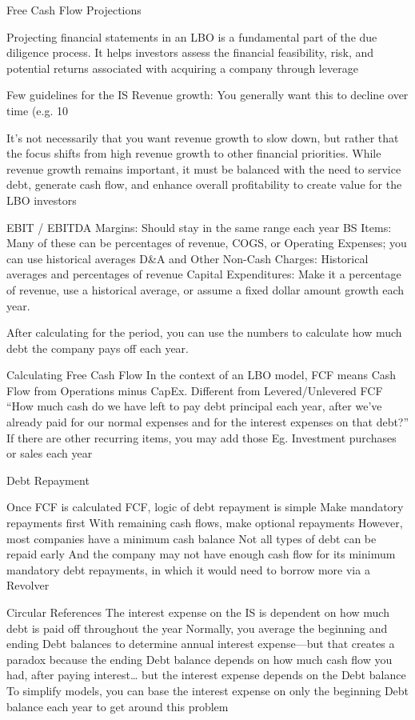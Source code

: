 \documentclass[10pt]{article}
\begin{document}
    \begin{core}{Free Cash Flow Projections}

      Projecting financial statements in an LBO is a fundamental part of the due diligence process. It helps investors assess the financial feasibility, risk, and potential returns associated with acquiring a company through leverage

      Few guidelines for the IS
      Revenue growth: You generally want this to decline over time (e.g. 10%

      It’s not necessarily that you want revenue growth to slow down, but rather that the focus shifts from high revenue growth to other financial priorities. While revenue growth remains important, it must be balanced with the need to service debt, generate cash flow, and enhance overall profitability to create value for the LBO investors

      EBIT / EBITDA Margins: Should stay in the same range each year
      BS Items: Many of these can be percentages of revenue, COGS, or Operating Expenses; you can use historical averages
      D&A and Other Non-Cash Charges: Historical averages and percentages of revenue
      Capital Expenditures: Make it a percentage of revenue, use a historical average, or assume a fixed dollar amount growth each year.

      After calculating for the period, you can use the numbers to calculate how much debt the company pays off each year.

      Calculating Free Cash Flow
      In the context of an LBO model, FCF means Cash Flow from Operations minus CapEx. Different from Levered/Unlevered FCF
      “How much cash do we have left to pay debt principal each year, after we’ve already paid for our normal expenses and for the interest expenses on that debt?”
      If there are other recurring items, you may add those
      Eg. Investment purchases or sales each year

    \end{core}

    \begin{core}{Debt Repayment}

      Once FCF is calculated FCF, logic of debt repayment is simple
      Make mandatory repayments first
      With remaining cash flows, make optional repayments
      However, most companies have a minimum cash balance
      Not all types of debt can be repaid early
      And the company may not have enough cash flow for its minimum mandatory debt repayments, in which it would need to borrow more via a Revolver

      Circular References
      The interest expense on the IS is dependent on how much debt is paid off throughout the year
      Normally, you average the beginning and ending Debt balances to determine annual interest expense—but that creates a paradox because the ending Debt balance depends on how much cash flow you had, after paying interest… but the interest expense depends on the Debt balance
      To simplify models, you can base the interest expense on only the beginning Debt balance each year to get around this problem

    \end{core}
\end{document}
